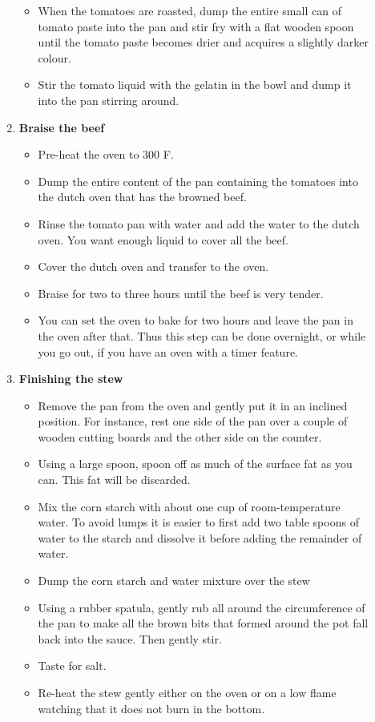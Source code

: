 \documentclass[11pt,letterpaper]{article}
\newcommand \fileName {RustRoast}
\begin{document}
\begin{description}
\begin{enumerate}
\begin{itemize}
		\item When the tomatoes are roasted, dump the entire small can of tomato paste into the pan and stir fry with a flat wooden spoon until the tomato paste becomes drier and acquires a slightly darker colour.
		\item Stir the  tomato liquid with the gelatin  in the bowl and dump it into the pan stirring around.
	\end{itemize}
	\item {\bf Braise the beef}
	\begin{itemize}
	\item Pre-heat the oven to 300 F.
	\item Dump the entire content of the pan containing the tomatoes into the dutch oven that has the browned beef.
	\item Rinse the tomato pan with water and add the water to the dutch oven. You want enough liquid to cover all the beef.
	\item Cover the dutch oven and transfer to the oven.
	\item Braise for two to three hours until the beef is very tender.
	\item You can set the oven to bake for two hours and leave the pan in the oven after that. Thus this step can be done overnight, or while you go out, if you have an oven with a timer feature.
	\end{itemize}
	\item {\bf Finishing the stew}
	\begin{itemize}
	\item Remove the pan from the oven and gently put it in an inclined position. For instance, rest one side of the pan over a couple of wooden cutting boards and the other side on the counter. 
	\item Using a large spoon, spoon off as much of the surface fat as you can. This fat will be discarded.
	\item Mix the corn starch with about one cup of room-temperature water. To avoid lumps it is easier to first add two table spoons of water to the starch and dissolve it before adding the remainder of water.
	\item Dump the corn starch and water mixture over the stew 
	\item Using a rubber spatula, gently rub all around the circumference of the pan to make all the brown bits that formed around the pot fall back into the sauce. Then gently stir.
	\item Taste for salt.
	\item Re-heat the stew gently either on the oven or on a low flame watching that it does not burn in the bottom.
	\end{itemize}
     	\end{enumerate}         
\end{description}

\end{document}
